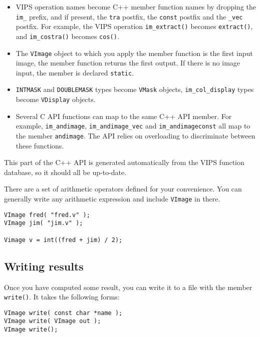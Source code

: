 \begin{itemize}

\item
VIPS operation names become C++ member function names by dropping the
\verb+im_+ prefix, and if present, the \verb+tra+ postfix, the \verb+const+
postfix and the \verb+_vec+ postfix. For example, the
VIPS operation \verb+im_extract()+ becomes \verb+extract()+, and
\verb+im_costra()+ becomes \verb+cos()+.

\item
The \verb+VImage+ object to which you apply the member function is the first
input image, the member function returns the first output. If there is no
image input, the member is declared \verb+static+.

\item
\verb+INTMASK+ and \verb+DOUBLEMASK+ types become \verb+VMask+ objects,
\verb+im_col_display+ types become \verb+VDisplay+ objects.

\item
Several C API functions can map to the same C++ API member. For example,
\verb+im_andimage+, \verb+im_andimage_vec+ and \verb+im_andimageconst+ all map
to the member \verb+andimage+. The API relies on overloading to
discriminate between these functions.

\end{itemize}

This part of the C++ API is generated automatically from the VIPS function
database, so it should all be up-to-date.

There are a set of arithmetic operators defined for your convenience. You can
generally write any arithmetic expression and include \verb+VImage+ in there.

\begin{verbatim}
VImage fred( "fred.v" );
VImage jim( "jim.v" );

Vimage v = int((fred + jim) / 2);
\end{verbatim}

\subsection{Writing results}

Once you have computed some result, you can write it to a file with the member
\verb+write()+. It takes the following forms:

\begin{verbatim}
VImage write( const char *name );
VImage write( VImage out );
VImage write();
\end{verbatim}

